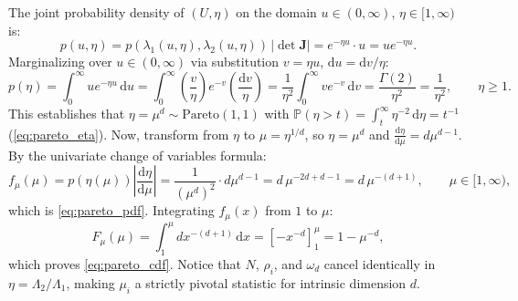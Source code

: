 The joint probability density of $(U, \eta)$ on the domain $u \in
(0, \infty)$, $\eta \in [1, \infty)$ is:
\begin{equation}
  p(u, \eta) = p(\lambda_1(u, \eta), \lambda_2(u, \eta)) \, |\det
  \mathbf{J}| = e^{-\eta u} \cdot u = u e^{-\eta u}.
\end{equation}
Marginalizing over $u \in (0, \infty)$ via substitution $v = \eta
u$, $\mathrm{d}u = \mathrm{d}v / \eta$:
\begin{equation}
  p(\eta) = \int_0^\infty u e^{-\eta u}\,\mathrm{d}u = \int_0^\infty
  \left(\frac{v}{\eta}\right) e^{-v} \left(\frac{\mathrm{d}v}{\eta}\right)
  = \frac{1}{\eta^2} \int_0^\infty v e^{-v}\,\mathrm{d}v =
  \frac{\Gamma(2)}{\eta^2} = \frac{1}{\eta^2}, \qquad \eta \ge 1.
\end{equation}
This establishes that $\eta = \mu^d \sim \mathrm{Pareto}(1, 1)$ with
$\mathbb{P}(\eta > t) = \int_t^\infty \eta^{-2}\,\mathrm{d}\eta =
t^{-1}$ (\cref{eq:pareto_eta}).
Now, transform from $\eta$ to $\mu = \eta^{1/d}$, so $\eta = \mu^d$
and $\frac{\mathrm{d}\eta}{\mathrm{d}\mu} = d \mu^{d-1}$.
By the univariate change of variables formula:
\begin{equation}
  f_\mu(\mu) = p(\eta(\mu)) \left|
  \frac{\mathrm{d}\eta}{\mathrm{d}\mu} \right| = \frac{1}{(\mu^d)^2}
  \cdot d \mu^{d-1} = d \, \mu^{-2d + d - 1} = d \, \mu^{-(d+1)},
  \qquad \mu \in [1, \infty),
\end{equation}
which is \cref{eq:pareto_pdf}. Integrating $f_\mu(x)$ from $1$ to $\mu$:
\begin{equation}
  F_\mu(\mu) = \int_1^\mu d x^{-(d+1)}\,\mathrm{d}x = \left[ -x^{-d}
  \right]_1^\mu = 1 - \mu^{-d},
\end{equation}
which proves \cref{eq:pareto_cdf}. Notice that $N$, $\rho_i$,
and $\omega_d$ cancel identically in $\eta = \Lambda_2/\Lambda_1$,
making $\mu_i$ a strictly pivotal statistic for intrinsic dimension $d$.


